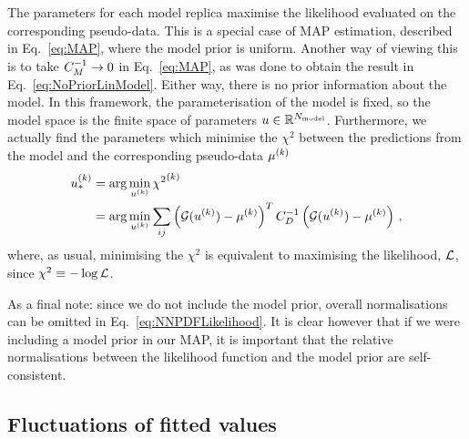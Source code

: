 The parameters for each model replica maximise the likelihood evaluated on the
corresponding pseudo-data. This is a special case of MAP estimation, described
in Eq.~\eqref{eq:MAP}, where the model prior is uniform. Another way of viewing
this is to take $C_M^{-1} \to 0$ in Eq.~\eqref{eq:MAP}, as was done
to obtain the result in Eq.~\ref{eq:NoPriorLinModel}. Either way,
there is no prior information about the model. In this framework, the
parameterisation of the model is fixed, so the model space is the finite space
of parameters $u \in \mathbb{R}^{N_{\rm model}}$. Furthermore, we actually find the
parameters which minimise the $\chi^2$ between the predictions from the model
and the corresponding pseudo-data $\mu^{(k)}$
\begin{equation}\label{eq:NNPDFLikelihood}
    \begin{split}
        u_*^{(k)} &= \arg\min_{u^{(k)}} {\chi^2}^{(k)} \\
        &= \arg\min_{u^{(k)}} \sum_{ij}
        \left( \mathcal{G}(u^{(k)}) - \mu^{(k)} \right)^T
        C_{D}^{-1}
        \left( \mathcal{G}(u^{(k)}) - \mu^{(k)} \right) \, ,
    \end{split}
\end{equation}
where, as usual, minimising the $\chi^2$ is equivalent to maximising the
likelihood, $\mathcal{L}$, since $\chi^2 \equiv -\log{\mathcal{L}}$.

As a final note: since we do not include the model prior, overall normalisations
can be omitted in Eq.~\ref{eq:NNPDFLikelihood}. It is clear however that if we
were including a model prior in our MAP, it is important that the relative
normalisations between the likelihood function and the model prior are
self-consistent.

\subsection{Fluctuations of fitted values}
\label{sec:fluct-fit-values}

